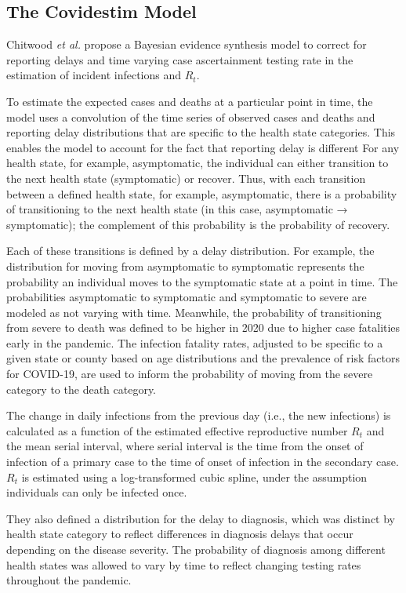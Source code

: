 \documentclass[12pt,twoside]{smiththesis}
\begin{document}
\hypertarget{the-covidestim-model}{%
\subsection{The Covidestim Model}\label{the-covidestim-model}}

Chitwood \emph{et al.} propose a Bayesian evidence synthesis model to correct for reporting delays and time varying case ascertainment testing rate in the estimation of incident infections and \(R_t\).

To estimate the expected cases and deaths at a particular point in time, the model uses a convolution of the time series of observed cases and deaths and reporting delay distributions that are specific to the health state categories. This enables the model to account for the fact that reporting delay is different For any health state, for example, asymptomatic, the individual can either transition to the next health state (symptomatic) or recover. Thus, with each transition between a defined health state, for example, asymptomatic, there is a probability of transitioning to the next health state (in this case, asymptomatic → symptomatic); the complement of this probability is the probability of recovery.

Each of these transitions is defined by a delay distribution. For example, the distribution for moving from asymptomatic to symptomatic represents the probability an individual moves to the symptomatic state at a point in time. The probabilities asymptomatic to symptomatic and symptomatic to severe are modeled as not varying with time. Meanwhile, the probability of transitioning from severe to death was defined to be higher in 2020 due to higher case fatalities early in the pandemic. The infection fatality rates, adjusted to be specific to a given state or county based on age distributions and the prevalence of risk factors for COVID-19, are used to inform the probability of moving from the severe category to the death category.

The change in daily infections from the previous day (i.e., the new infections) is calculated as a function of the estimated effective reproductive number \(R_t\) and the mean serial interval, where serial interval is the time from the onset of infection of a primary case to the time of onset of infection in the secondary case. \(R_t\) is estimated using a log-transformed cubic spline, under the assumption individuals can only be infected once.

They also defined a distribution for the delay to diagnosis, which was distinct by health state category to reflect differences in diagnosis delays that occur depending on the disease severity.
The probability of diagnosis among different health states was allowed to vary by time to reflect changing testing rates throughout the pandemic.
\end{document}
